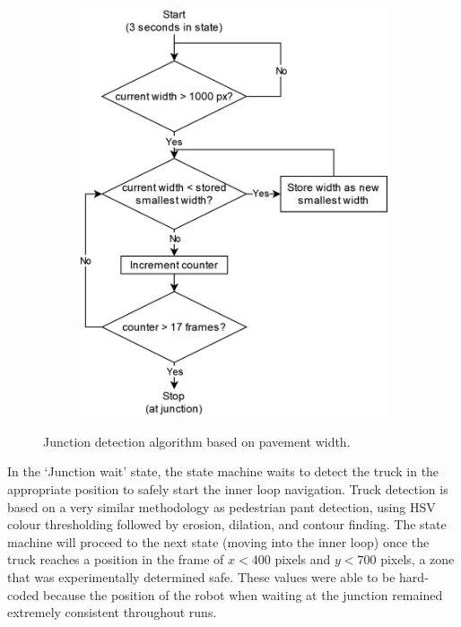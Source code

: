 \documentclass[titlepage, twocolumn]{article}
\begin{document}
\begin{figure}
\begin{center}
\begin{subfigure}{0.5\linewidth}
                        \includegraphics[width=\linewidth]{junctiondiagram.png}
                \label{fig:junctionalg}
                      \end{subfigure}
                \end{center}
                \caption{Junction detection algorithm based on pavement width.}
                \label{fig:junctiondetect}
            \end{figure}

            In the `Junction wait' state, the state machine waits to detect the truck in the appropriate position to safely start the inner loop navigation. Truck detection is based on a very similar methodology as pedestrian pant detection, using HSV colour thresholding followed by erosion, dilation, and contour finding. The state machine will proceed to the next state (moving into the inner loop) once the truck reaches a position in the frame of $x < 400$ pixels and $y<700 $ pixels, a zone that was experimentally determined safe. These values were able to be hard-coded because the position of the robot when waiting at the junction remained extremely consistent throughout runs. 
\end{document}

